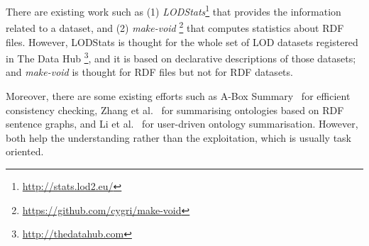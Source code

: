 There are existing work such as (1) \emph{LODStats}\footnote{\footnotesize \url{http://stats.lod2.eu/}} that provides the information related to a dataset, and (2) \emph{make-void} \footnote{\footnotesize \url{https://github.com/cygri/make-void}} that computes statistics about RDF files. However, LODStats is thought for the whole set of LOD datasets registered in The Data Hub \footnote{\footnotesize \url{http://thedatahub.com}}, and it is based on declarative descriptions of those datasets; and \emph{make-void} is thought for RDF files but not for RDF datasets.

Moreover, there are some existing efforts such as A-Box Summary~\cite{fokoue2006summary} for efficient consistency checking, Zhang et al.~\cite{ZhangCQ07} for summarising ontologies based on RDF sentence graphs, and Li et al.~\cite{LiM10} for user-driven ontology summarisation. However, both help the understanding rather than the exploitation, which is usually task oriented.

